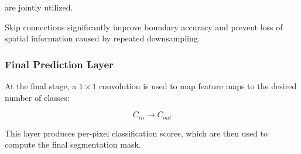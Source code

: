 are jointly utilized.

Skip connections significantly improve boundary accuracy and prevent loss of spatial information caused by repeated downsampling.

\subsubsection{Final Prediction Layer}

At the final stage, a $1 \times 1$ convolution is used to map feature maps to the desired number of classes:

\[
C_{in} \rightarrow C_{out}
\]

This layer produces per-pixel classification scores, which are then used to compute the final segmentation mask.